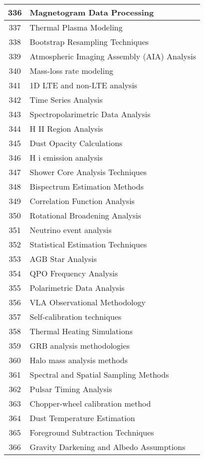 \begin{table}[htbp]
\begin{tabular}{|c|l|}
\hline
336 & Magnetogram Data Processing \\
\hline
337 & Thermal Plasma Modeling \\
\hline
338 & Bootstrap Resampling Techniques \\
\hline
339 & Atmospheric Imaging Assembly (AIA) Analysis \\
\hline
340 & Mass-loss rate modeling \\
\hline
341 & 1D LTE and non-LTE analysis \\
\hline
342 & Time Series Analysis \\
\hline
343 & Spectropolarimetric Data Analysis \\
\hline
344 & H II Region Analysis \\
\hline
345 & Dust Opacity Calculations \\
\hline
346 & H i emission analysis \\
\hline
347 & Shower Core Analysis Techniques \\
\hline
348 & Bispectrum Estimation Methods \\
\hline
349 & Correlation Function Analysis \\
\hline
350 & Rotational Broadening Analysis \\
\hline
351 & Neutrino event analysis \\
\hline
352 & Statistical Estimation Techniques \\
\hline
353 & AGB Star Analysis \\
\hline
354 & QPO Frequency Analysis \\
\hline
355 & Polarimetric Data Analysis \\
\hline
356 & VLA Observational Methodology \\
\hline
357 & Self-calibration techniques \\
\hline
358 & Thermal Heating Simulations \\
\hline
359 & GRB analysis methodologies \\
\hline
360 & Halo mass analysis methods \\
\hline
361 & Spectral and Spatial Sampling Methods \\
\hline
362 & Pulsar Timing Analysis \\
\hline
363 & Chopper-wheel calibration method \\
\hline
364 & Dust Temperature Estimation \\
\hline
365 & Foreground Subtraction Techniques \\
\hline
366 & Gravity Darkening and Albedo Assumptions \\

\end{tabular}
\end{table}
